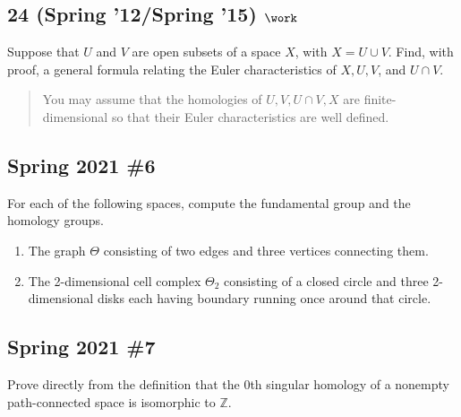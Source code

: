 \hypertarget{spring-12spring-15-work}{%
\subsection{\texorpdfstring{24 (Spring '12/Spring '15)
\(\work\)}{24 (Spring '12/Spring '15) \textbackslash work}}\label{spring-12spring-15-work}}

Suppose that \(U\) and \(V\) are open subsets of a space \(X\), with
\(X = U \cup V\). Find, with proof, a general formula relating the Euler
characteristics of \(X, U, V\), and \(U \cap V\).

\begin{quote}
You may assume that the homologies of \(U, V, U \cap V, X\) are
finite-dimensional so that their Euler characteristics are well defined.
\end{quote}

\hypertarget{spring-2021-6}{%
\subsection{Spring 2021 \#6}\label{spring-2021-6}}

\begin{problem}[Spring 2021, 6]

For each of the following spaces, compute the fundamental group and the
homology groups.

\begin{enumerate}
\def\labelenumi{\alph{enumi}.}
\item
  The graph \(\Theta\) consisting of two edges and three vertices
  connecting them.
\item
  The 2-dimensional cell complex \(\Theta_2\) consisting of a closed
  circle and three 2-dimensional disks each having boundary running once
  around that circle.
\end{enumerate}

\end{problem}

\hypertarget{spring-2021-7}{%
\subsection{Spring 2021 \#7}\label{spring-2021-7}}

\begin{problem}[Spring 2021, 7]

Prove directly from the definition that the 0th singular homology of a
nonempty path-connected space is isomorphic to \({\mathbb{Z}}\).

\end{problem}

